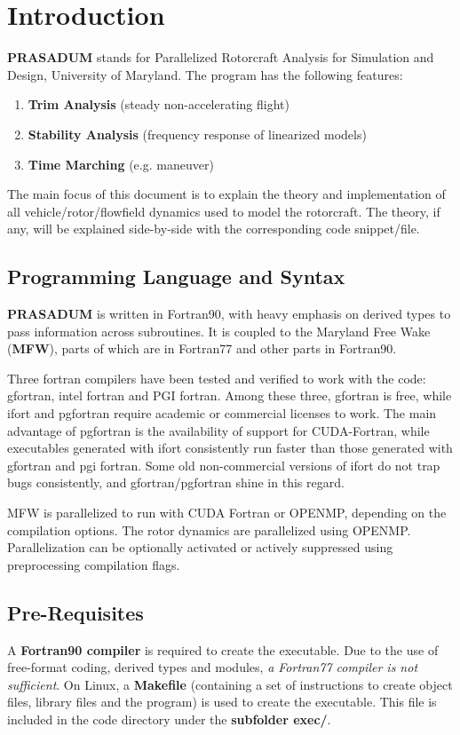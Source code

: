 \section{\textbf{Introduction}}

\textbf{PRASADUM} stands for Parallelized Rotorcraft Analysis for Simulation and Design, University of Maryland. The program has the following features:
\begin{enumerate}
\item \textbf{Trim Analysis} (steady non-accelerating flight)
\item \textbf{Stability Analysis} (frequency response of linearized models) 
\item \textbf{Time Marching} (e.g. maneuver)
\end{enumerate}

The main focus of this document is to explain the theory and implementation of all vehicle/rotor/flowfield dynamics used to model the rotorcraft. The theory, if any, will be explained side-by-side with the corresponding code snippet/file. 

\subsection{\textbf{Programming Language and Syntax}}
\textbf{PRASADUM} is written in Fortran90, with heavy emphasis on derived types to pass information across subroutines. It is coupled to the Maryland Free Wake (\textbf{MFW}), parts of which are in Fortran77 and other parts in Fortran90. 

Three fortran compilers have been tested and verified to work with the code: gfortran, intel fortran and PGI fortran. Among these three, gfortran is free, while ifort and pgfortran require academic or commercial licenses to work. The main advantage of pgfortran is the availability of support for CUDA-Fortran, while executables generated with ifort consistently run faster than those generated with gfortran and pgi fortran. Some old non-commercial versions of ifort do not trap bugs consistently, and gfortran/pgfortran shine in this regard.

MFW is parallelized to run with CUDA Fortran or OPENMP, depending on the compilation options. The rotor dynamics are parallelized using OPENMP. Parallelization can be optionally activated or actively suppressed using preprocessing compilation flags. 

\subsection{\textbf{Pre-Requisites}}
A \textbf{Fortran90 compiler} is required to create the executable. Due to the use of free-format coding, derived types and modules, \emph{a Fortran77 compiler is not sufficient}. On Linux, a \textbf{Makefile} (containing a set of instructions to create object files, library files and the program) is used to create the executable. This file is included in the code directory under the \textbf{subfolder exec/}.

